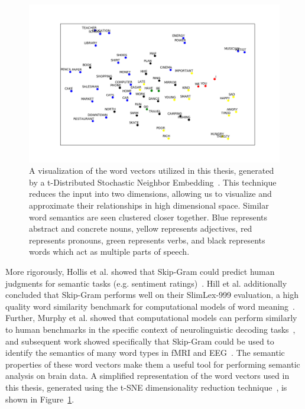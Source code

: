 \begin{figure}[t]
 \centerline{
   \includegraphics[width=\linewidth]{figures/tsne}
 }
 \caption[Visualization of Utilized Word Vectors]{
   A visualization of the word vectors utilized in this thesis, generated by a 
   t-Distributed Stochastic Neighbor Embedding~\cite{maaten2008visualizing}.  
   This technique reduces the input into two dimensions, allowing us to 
   visualize and approximate their relationships in high dimensional space.  
   Similar word semantics are seen clustered closer together. Blue represents 
   abstract and concrete nouns, yellow represents adjectives, red represents 
   pronouns, green represents verbs, and black represents words which act as 
   multiple parts of speech.
 }
 \label{fig:tsne}
\end{figure}

More rigorously, Hollis et al. showed that Skip-Gram could predict human 
judgments for semantic tasks (e.g. sentiment 
ratings)~\cite{hollis2017extrapolating}.  Hill et al.  additionally concluded 
that Skip-Gram performs well on their SlimLex-999 evaluation, a high quality 
word similarity benchmark for computational models of word 
meaning~\cite{hill2016simlex}. Further, Murphy et al. showed that computational 
models can perform similarly to human benchmarks in the specific context of 
neurolinguistic decoding tasks~\cite{Murphy2012}, and subsequent work showed 
specifically that Skip-Gram could be used to identify the semantics of many 
word types in fMRI and EEG~\cite{xu2016brainbench}. The semantic properties of 
these word vectors make them a useful tool for performing semantic analysis on 
brain data. A simplified representation of the word vectors used in this 
thesis, generated using the t-SNE dimensionality reduction 
technique~\cite{maaten2008visualizing}, is shown in Figure~\ref{fig:tsne}.

